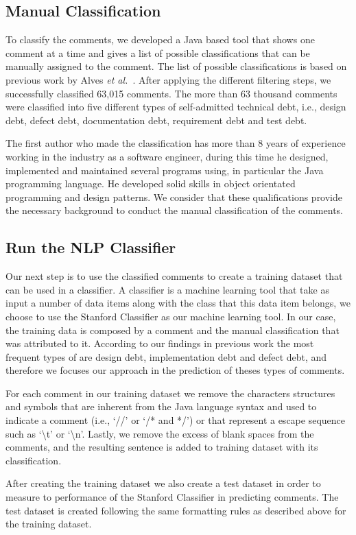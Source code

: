 \subsection{Manual Classification} %
\label{sub:manual_classification}

To classify the comments, we developed a Java based tool that shows one comment at a time and gives a list of possible classifications that can be manually assigned to the comment. The list of possible classifications is based on previous work by Alves \textit{et al.}~\cite{Alves2014MTD}. After applying the different filtering steps, we successfully classified 63,015 comments. The more than 63 thousand comments were classified into five different types of self-admitted technical debt, i.e., design debt, defect debt, documentation debt, requirement debt and test debt.
 
The first author who made the classification has more than 8 years of experience working in the industry as a software engineer, during this time he designed, implemented and maintained several programs using, in particular the Java programming language. He developed solid skills in object orientated programming and design patterns. We consider that these qualifications provide the necessary background to conduct the manual classification of the comments.   


\subsection{Run the NLP Classifier} %
\label{sub:run_the_nlp_classifier}
 
Our next step is to use the classified \SATD comments to create a training dataset that can be used in a classifier. A classifier is a machine learning tool that take as input a number of data items along with the class that this data item belongs, we choose to use the Stanford Classifier  as our machine learning tool. In our case, the training data is composed by a comment and the manual classification that was attributed to it. According to our findings in previous work \cite{Maldonado2015MTD} the most frequent types of \SATD are design debt, implementation debt and defect debt, and therefore we focuses our approach in the prediction of theses types of \SATD comments.

For each comment in our training dataset we remove the characters structures and symbols that are inherent from the Java language syntax and used to indicate a comment (i.e., `//' or `/* and */') or that represent a escape sequence such as `\textbackslash t' or `\textbackslash n'. Lastly, we remove the excess of blank spaces from the comments, and the resulting sentence is added to training dataset with its classification. 

After creating the training dataset we also create a test dataset in order to measure to performance of the Stanford Classifier in predicting \SATD comments. The test dataset is created following the same formatting rules as described above for the training dataset. 

